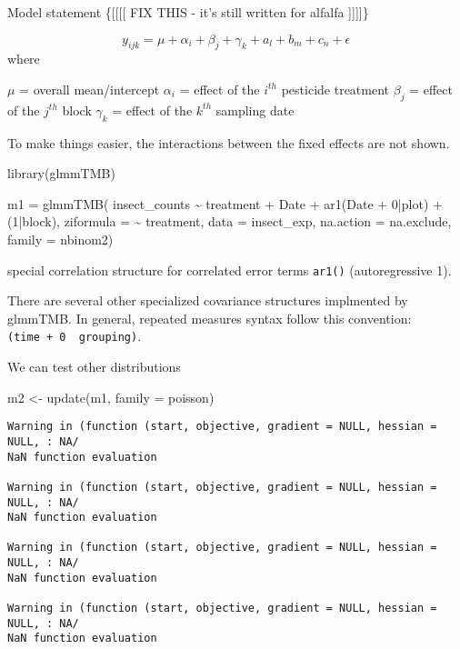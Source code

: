\documentclass[
  letterpaper,
  DIV=11,
  numbers=noendperiod]{scrreprt}
\newenvironment{Shaded}{\begin{snugshade}}{\end{snugshade}}
\newcommand{\AttributeTok}[1]{\textcolor[rgb]{0.40,0.45,0.13}{#1}}
\newcommand{\DecValTok}[1]{\textcolor[rgb]{0.68,0.00,0.00}{#1}}
\newcommand{\FunctionTok}[1]{\textcolor[rgb]{0.28,0.35,0.67}{#1}}
\newcommand{\NormalTok}[1]{\textcolor[rgb]{0.00,0.23,0.31}{#1}}
\newcommand{\OtherTok}[1]{\textcolor[rgb]{0.00,0.23,0.31}{#1}}
\newcommand{\SpecialCharTok}[1]{\textcolor[rgb]{0.37,0.37,0.37}{#1}}
\begin{document}
Model statement \{{[}{[}{[}{[} FIX THIS - it's still written for alfalfa
{]}{]}{]}{]}\}

\[y_{ijk} = \mu + \alpha_i+\beta_j + \gamma_k + a_l + b_m + c_n + \epsilon_{}\]
where

\(\mu\) = overall mean/intercept \(\alpha_i\) = effect of the \(i^{th}\)
pesticide treatment \(\beta_j\) = effect of the \(j^{th}\) block
\(\gamma_k\) = effect of the \(k^{th}\) sampling date

To make things easier, the interactions between the fixed effects are
not shown.

\begin{Shaded}
\begin{Highlighting}[]
\FunctionTok{library}\NormalTok{(glmmTMB)}

\NormalTok{m1 }\OtherTok{=} \FunctionTok{glmmTMB}\NormalTok{(}
\NormalTok{  insect\_counts }\SpecialCharTok{\textasciitilde{}}\NormalTok{ treatment }\SpecialCharTok{+}\NormalTok{ Date }\SpecialCharTok{+} \FunctionTok{ar1}\NormalTok{(Date }\SpecialCharTok{+} \DecValTok{0}\SpecialCharTok{|}\NormalTok{plot) }\SpecialCharTok{+}\NormalTok{ (}\DecValTok{1}\SpecialCharTok{|}\NormalTok{block),}
  \AttributeTok{ziformula =} \SpecialCharTok{\textasciitilde{}}\NormalTok{ treatment,}
  \AttributeTok{data =}\NormalTok{ insect\_exp, }\AttributeTok{na.action =}\NormalTok{ na.exclude, }
  \AttributeTok{family =}\NormalTok{ nbinom2)}
\end{Highlighting}
\end{Shaded}

special correlation structure for correlated error terms \texttt{ar1()}
(autoregressive 1).

There are several other specialized covariance structures implmented by
glmmTMB. In general, repeated measures syntax follow this convention:
\texttt{(time\ +\ 0\ \textbar{}\ grouping)}.

We can test other distributions

\begin{Shaded}
\begin{Highlighting}[]
\NormalTok{m2 }\OtherTok{\textless{}{-}} \FunctionTok{update}\NormalTok{(m1, }\AttributeTok{family =}\NormalTok{ poisson)}
\end{Highlighting}
\end{Shaded}

\begin{verbatim}
Warning in (function (start, objective, gradient = NULL, hessian = NULL, : NA/
NaN function evaluation

Warning in (function (start, objective, gradient = NULL, hessian = NULL, : NA/
NaN function evaluation

Warning in (function (start, objective, gradient = NULL, hessian = NULL, : NA/
NaN function evaluation

Warning in (function (start, objective, gradient = NULL, hessian = NULL, : NA/
NaN function evaluation
\end{verbatim}
\end{document}
